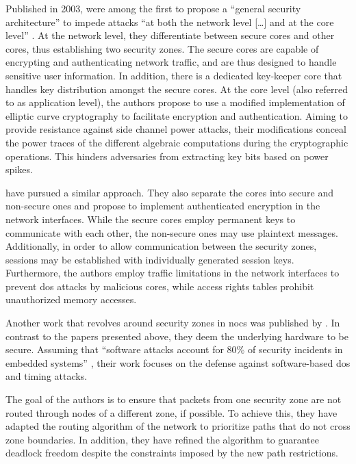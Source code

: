 Published in 2003, \citeauthor{gebotys03securityframework} \cite{gebotys03securityframework} were among the first to propose a \enquote{general security architecture}
\cite[1]{gebotys03securityframework} to impede attacks \enquote{at both the network level […] and at the core level}
\cite[1]{gebotys03securityframework}. At the network level, they differentiate between secure cores and other cores, thus establishing two security
zones. The secure cores are capable of encrypting and authenticating network
traffic, and are thus designed to handle sensitive user information. In addition, there is a dedicated key-keeper core that handles key distribution
amongst the secure cores. At the core level (also referred to as application level), the authors propose to use a modified implementation of elliptic curve
cryptography to facilitate encryption and authentication. Aiming to provide resistance against side channel power attacks, their modifications conceal
the power traces of the different algebraic computations during the cryptographic operations. This hinders adversaries from extracting key bits based
on power spikes.

\citeauthor{kapoor13nocauthenc} \cite{kapoor13nocauthenc} have pursued a similar approach. They also separate the cores into secure and non-secure
ones and propose to implement authenticated encryption in the network interfaces. While the secure
cores employ permanent keys to communicate with each other, the non-secure ones may use plaintext messages. Additionally, in order to allow
communication between the security zones, sessions may be established with individually generated session keys. Furthermore, the authors employ
traffic limitations in the network interfaces to prevent \gls{dos} attacks by malicious cores, while access rights tables prohibit unauthorized
memory accesses.

Another work that revolves around security zones in \glspl{noc} was published by \citeauthor{fernandes16nocrouting} \cite{fernandes16nocrouting}.
In contrast to the papers presented above, they deem the underlying hardware to be secure. Assuming that \enquote{software attacks account
for 80\% of security incidents in embedded systems} \cite[1]{fernandes16nocrouting}, their work focuses on the defense against software-based
\gls{dos} and timing attacks.

The goal of the authors is to ensure that packets from one security zone are not routed through nodes of a different zone, if possible. To achieve
this, they have adapted the routing algorithm of the network to prioritize paths that do not cross zone boundaries. In addition, they have
refined the algorithm to guarantee deadlock freedom despite the constraints imposed by the new path restrictions.

